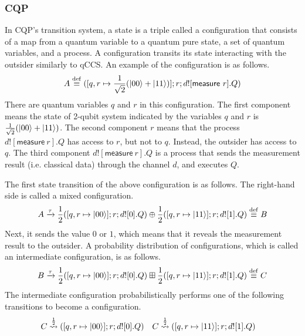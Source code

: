 \subsubsection{CQP}
In CQP's transition system, a state is a triple called a configuration
that consists of a map from a quantum variable to a quantum pure
state, a set of quantum variables, and a process. 
A configuration transits its state interacting with the outsider
similarly to qCCS.
An example of the configuration is as follows.
\[
A \overset{\mathrm{def}}{\equiv} ([q,r \mapsto
 \frac{1}{\sqrt{2}}(|00\rangle+|11\rangle)];r;d![\mathsf{measure}~r].Q)
\]
There are quantum variables $q$ and $r$ in this configuration.
The first component means the state of 2-qubit system indicated by 
the variables $q$ and $r$ is $\frac{1}{\sqrt{2}}(|00\rangle+|11\rangle)$.
The second component $r$ means that the process 
$d![\mathsf{measure}~r].Q$ has
access to $r$, but not to $q$. Instead, the outsider has access to $q$.
The third component $d![\mathsf{measure}~r].Q$ is a process
that sends the measurement result (i.e. classical data) through the 
channel $d$, and executes $Q$.

The first state transition of the above configuration is as follows.
The right-hand side is called a mixed configuration.
\[
 A
 \xrightarrow{\tau}
 \frac{1}{2}([q,r \mapsto
 |00\rangle];r; d![0].Q) \oplus
 \frac{1}{2}([q,r \mapsto
 |11\rangle];r; d![1].Q) \overset{\mathrm{def}}{\equiv} B
\]
Next, it sends the value $0$ or $1$, which means
that it reveals the measurement result to the outsider.
A probability distribution of configurations,
which is called an intermediate configuration, is as follows.
\[
 B
 \xrightarrow{\tau}
 \frac{1}{2}([q,r \mapsto
 |00\rangle];r; d![0].Q) \boxplus
 \frac{1}{2}([q,r \mapsto
 |11\rangle];r; d![1].Q) \overset{\mathrm{def}}{\equiv} C
\]
The intermediate configuration probabilistically
performs one of 
the following transitions to become a configuration.
\begin{align*}
 & C
 \overset{\frac{1}{2}}{\rightsquigarrow}
 ([q,r \mapsto
 |00\rangle];r; d![0].Q)
&&C
 \overset{\frac{1}{2}}{\rightsquigarrow}
 ([q,r \mapsto
 |11\rangle];r; d![1].Q)
\end{align*}

